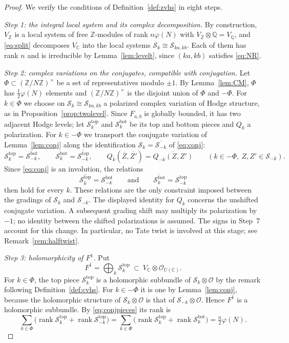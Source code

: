 \documentclass[11pt]{amsart}
\theoremstyle{definition}
\theoremstyle{remark}
\numberwithin{equation}{section}
\newcommand{\Q}{\mathbb{Q}}
\newcommand{\Z}{\mathbb{Z}}
\newcommand{\C}{\mathbb{C}}
\newcommand{\cS}{\mathcal{S}}
\newcommand{\cO}{\mathcal{O}}
\newcommand{\tp}{\mathrm{top}}
\newcommand{\bt}{\mathrm{bot}}
\DeclareMathOperator{\rank}{rank}
\newcommand{\Fab}{F_{a,b}}
\begin{document}
\begin{proof}
We verify the conditions of Definition~\ref{def:zvhs} in eight steps.

\emph{Step 1: the integral local system and its complex decomposition.} By construction, $V_\Z$ is a local system of free $\Z$-modules of rank $n\varphi(N)$ with $V_\Z\otimes\Q=V_\Q$, and \eqref{eq:split} decomposes $V_\C$ into the local systems $\cS_k\cong\cS_{ka,kb}$. Each of them has rank $n$ and is irreducible by Lemma~\ref{lem:levelt}, since $(ka,kb)$ satisfies \eqref{eq:NR}.

\emph{Step 2: complex variations on the conjugates, compatible with conjugation.} Let $\Phi\subset(\Z/N\Z)^\times$ be a set of representatives modulo $\pm1$. By Lemma~\ref{lem:CM}, $\Phi$ has $\frac12\varphi(N)$ elements and $(\Z/N\Z)^\times$ is the disjoint union of $\Phi$ and $-\Phi$. For $k\in\Phi$ we choose on $\cS_k\cong\cS_{ka,kb}$ a polarized complex variation of Hodge structure, as in Proposition~\ref{prop:twolevel}. Since $\Fab$ is globally bounded, it has two adjacent Hodge levels; let $\cS_k^{\tp}$ and $\cS_k^{\bt}$ be its top and bottom pieces and $Q_k$ a polarization. For $k\in-\Phi$ we transport the conjugate variation of Lemma~\ref{lem:conj} along the identification $\cS_k=\overline{\cS_{-k}}$ of \eqref{eq:conj}:
\[
\cS_k^{\tp}=\overline{\cS_{-k}^{\bt}},\qquad\cS_k^{\bt}=\overline{\cS_{-k}^{\tp}},\qquad Q_k(\overline Z,\overline{Z'})=\overline{Q_{-k}(Z,Z')}\qquad(k\in-\Phi,\ Z,Z'\in\cS_{-k}).
\]
Since \eqref{eq:conj} is an involution, the relations
\begin{equation}\label{eq:conjpieces}
\overline{\cS_k^{\tp}}=\cS_{-k}^{\bt}\qquad\text{and}\qquad\overline{\cS_k^{\bt}}=\cS_{-k}^{\tp}
\end{equation}
then hold for every $k$. These relations are the only constraint imposed between the gradings of $\cS_k$ and $\cS_{-k}$. The displayed identity for $Q_k$ concerns the unshifted conjugate variation. A subsequent grading shift may multiply its polarization by $-1$; no identity between the shifted polarizations is assumed. The signs in Step~7 account for this change. In particular, no Tate twist is involved at this stage; see Remark~\ref{rem:halftwist}.

\emph{Step 3: holomorphicity of $F^1$.} Put
\[
F^1=\bigoplus_k\cS_k^{\tp}\ \subset\ V_\C\otimes\cO_{U(\C)} .
\]
For $k\in\Phi$, the top piece $\cS_k^{\tp}$ is a holomorphic subbundle of $\cS_k\otimes\cO$ by the remark following Definition~\ref{def:cvhs}. For $k\in-\Phi$ it is one by Lemma~\ref{lem:conj}, because the holomorphic structure of $\cS_k\otimes\cO$ is that of $\overline{\cS_{-k}}\otimes\cO$. Hence $F^1$ is a holomorphic subbundle. By \eqref{eq:conjpieces} its rank is
\[
\sum_{k\in\Phi}\big(\rank\cS_k^{\tp}+\rank\cS_{-k}^{\tp}\big)=\sum_{k\in\Phi}\big(\rank\cS_k^{\tp}+\rank\cS_k^{\bt}\big)=\tfrac n2\varphi(N).
\]


\end{proof}
\end{document}
